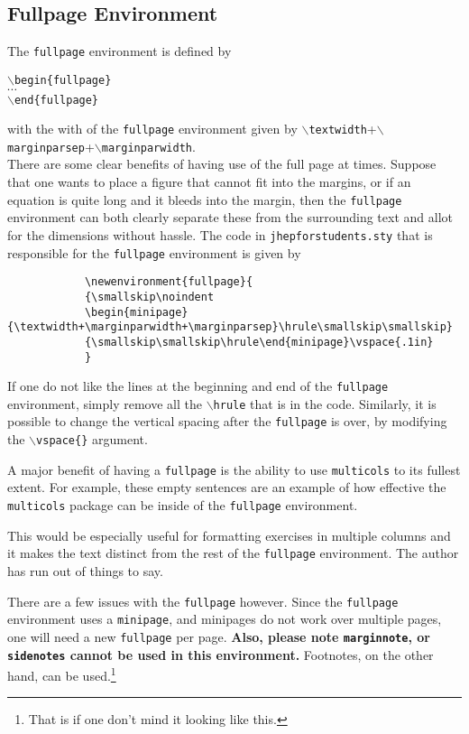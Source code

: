 \documentclass[10pt]{article}
\begin{document}
	\subsection{Fullpage Environment}\label{Sub: Fullpage}
	\begin{fullpage}
		The \texttt{fullpage} environment is defined by
		\begin{center}
			\texttt{$\backslash$begin\{fullpage\}}\\
			$\cdots$\\
			\texttt{$\backslash$end\{fullpage\}}
		\end{center}
		with the with of the \texttt{fullpage} environment given by \texttt{$\backslash$textwidth}+\texttt{$\backslash$marginparsep}+\texttt{$\backslash$marginparwidth}.\\

		There are some clear benefits of having use of the full page at times. Suppose that one wants to place a figure that cannot fit into the margins, or if an equation is quite long and it bleeds into the margin, then the \texttt{fullpage} environment can both clearly separate these from the surrounding text and allot for the dimensions without hassle. The code in \texttt{jhepforstudents.sty} that is responsible for the \texttt{fullpage} environment is given by
		\begin{verbatim}
			\newenvironment{fullpage}{
    		{\smallskip\noindent
    		\begin{minipage}{\textwidth+\marginparwidth+\marginparsep}\hrule\smallskip\smallskip}
    		{\smallskip\smallskip\hrule\end{minipage}\vspace{.1in}
    		}
		\end{verbatim}
		If one do not like the lines at the beginning and end of the \texttt{fullpage} environment, simply remove all the \texttt{$\backslash$hrule} that is in the code. Similarly, it is possible to change the vertical spacing after the \texttt{fullpage} is over, by modifying the \texttt{$\backslash$vspace\{\}} argument. 
		\begin{multicols}{2}
			A major benefit of having a \texttt{fullpage} is the ability to use \texttt{multicols} to its fullest extent. For example, these empty sentences are an example of how effective the \texttt{multicols} package can be inside of the \texttt{fullpage} environment. 

			This would be especially useful for formatting exercises in multiple columns and it makes the text distinct from the rest of the \texttt{fullpage} environment. The author has run out of things to say.
		\end{multicols}
		There are a few issues with the \texttt{fullpage} however. Since the \texttt{fullpage} environment uses a \texttt{minipage}, and minipages do not work over multiple pages, one will need a new \texttt{fullpage} per page. \textbf{Also, please note \texttt{marginnote}, or \texttt{sidenotes} cannot be used in this environment.} Footnotes, on the other hand, can be used.\footnote{That is if one don't mind it looking like this.}
	\end{fullpage}
\end{document}
